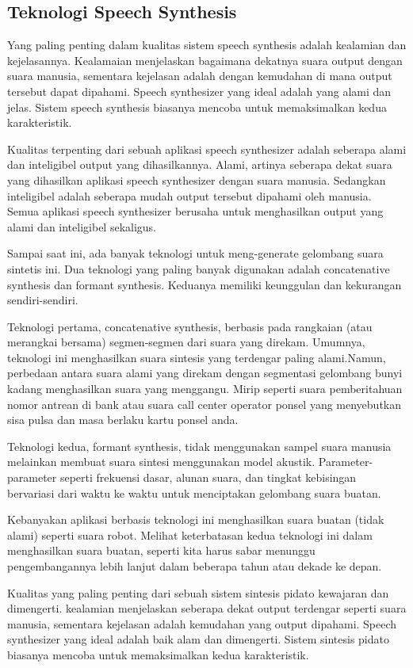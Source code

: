 \subsection{Teknologi Speech Synthesis}
Yang paling penting dalam kualitas sistem speech synthesis adalah kealamian dan kejelasannya. Kealamaian menjelaskan bagaimana dekatnya suara output dengan suara manusia, sementara kejelasan adalah dengan kemudahan di mana output tersebut dapat dipahami. Speech synthesizer yang ideal adalah yang alami dan jelas. Sistem speech synthesis biasanya mencoba untuk memaksimalkan kedua karakteristik.

Kualitas terpenting dari sebuah aplikasi speech synthesizer adalah seberapa alami dan inteligibel output yang dihasilkannya. Alami, artinya seberapa dekat suara yang dihasilkan aplikasi speech synthesizer dengan suara manusia. Sedangkan inteligibel adalah seberapa mudah output tersebut dipahami oleh manusia. Semua aplikasi speech synthesizer berusaha untuk menghasilkan output yang alami dan inteligibel sekaligus.

Sampai saat ini, ada banyak teknologi untuk meng-generate gelombang suara sintetis ini. Dua teknologi yang paling banyak digunakan adalah concatenative synthesis dan formant synthesis. Keduanya memiliki keunggulan dan kekurangan sendiri-sendiri.

Teknologi pertama, concatenative synthesis, berbasis pada rangkaian (atau merangkai bersama) segmen-segmen dari suara yang direkam. Umumnya, teknologi ini menghasilkan suara sintesis yang terdengar paling alami.Namun, perbedaan antara suara alami yang direkam dengan segmentasi gelombang bunyi kadang menghasilkan suara yang menggangu. Mirip seperti suara pemberitahuan nomor antrean di bank atau suara call center operator ponsel yang menyebutkan sisa pulsa dan masa berlaku kartu ponsel anda.

Teknologi kedua, formant synthesis, tidak menggunakan sampel suara manusia melainkan membuat suara sintesi menggunakan model akustik. Parameter-parameter seperti frekuensi dasar, alunan suara, dan tingkat kebisingan bervariasi dari waktu ke waktu untuk menciptakan gelombang suara buatan.

Kebanyakan aplikasi berbasis teknologi ini menghasilkan suara buatan (tidak alami) seperti suara robot. Melihat keterbatasan kedua teknologi ini dalam menghasilkan suara buatan, seperti kita harus sabar menunggu pengembangannya lebih lanjut dalam beberapa tahun atau dekade ke depan.

Kualitas yang paling penting dari sebuah sistem sintesis pidato kewajaran dan dimengerti. kealamian menjelaskan seberapa dekat output terdengar seperti suara manusia, sementara kejelasan adalah kemudahan yang output dipahami. Speech synthesizer yang ideal adalah baik alam dan dimengerti. Sistem sintesis pidato biasanya mencoba untuk memaksimalkan kedua karakteristik.

